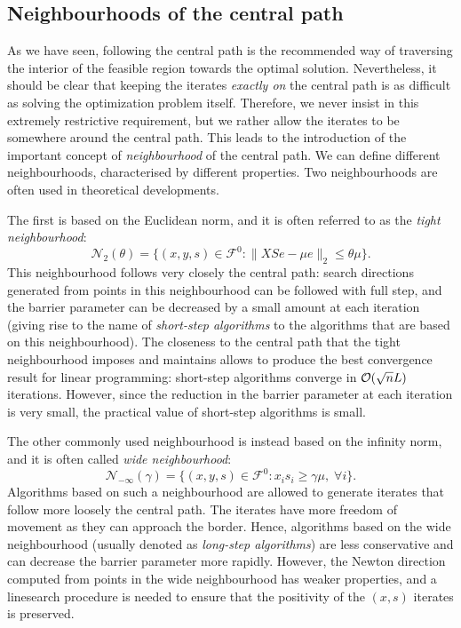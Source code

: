 %
%
\subsection{Neighbourhoods of the central path}
\label{sec:Neighbourhoods}

As we have seen, following the central path is the recommended
way of traversing the interior of the feasible region towards
the optimal solution. Nevertheless, it should be clear that keeping the
iterates {\em exactly on} the central path is as difficult as
solving the optimization problem itself.
%
Therefore, we never insist in this extremely restrictive requirement,
but we rather allow the iterates to be somewhere around the central path.
This leads to the introduction of the important concept of
{\em neighbourhood} of the central path. 
We can define different neighbourhoods, characterised
by different properties.
Two neighbourhoods are often used in theoretical developments.

The first is based on the Euclidean norm, and it is often referred
to as the {\em tight neighbourhood}:
\[
\mathcal{N}_2(\theta) = \{ (x,y,s) \in \mathcal{F}^0 :
                         \| XSe - \mu e \|_2 \le \theta\mu \}.
\]
This neighbourhood follows very closely the central path:
search directions generated from points in this neighbourhood can be 
followed with full step, and the barrier parameter can be decreased
by a small amount at each iteration (giving rise to the name
of {\em short-step algorithms} to the algorithms that are based on
this neighbourhood). 
The closeness to the central path that the tight neighbourhood
imposes and maintains allows to produce the best convergence result
for linear programming: short-step algorithms converge in 
$\mathcal{O}(\sqrt{n}L)$ iterations.
However, since the reduction in the barrier parameter at each iteration 
is very small, the practical value of short-step algorithms is small.

The other commonly used neighbourhood is instead based on the infinity norm, 
and it is often called {\em wide neighbourhood}:
\[
\mathcal{N}_{-\infty}(\gamma) = \{ (x,y,s) \in \mathcal{F}^0 :
                         x_is_i \ge \gamma\mu, \; \forall i \}.
\]
Algorithms based on such a neighbourhood are allowed to generate
iterates that follow more loosely the central path. The iterates 
have more freedom of movement as they can approach the border.
Hence, algorithms based on the wide neighbourhood (usually denoted as
{\em long-step algorithms}) are less conservative and can decrease 
the barrier parameter more rapidly.
However, the Newton direction computed from points in the wide 
neighbourhood  has weaker properties, and a linesearch procedure is
needed to ensure that the positivity of the $(x,s)$ iterates is
preserved.


